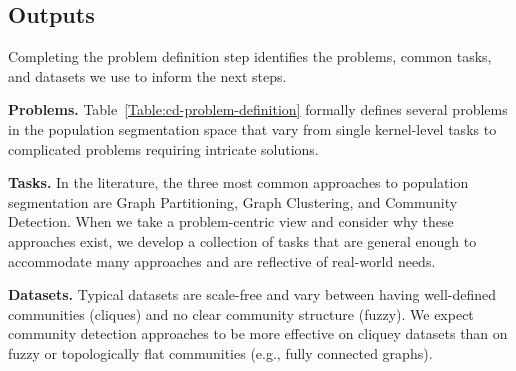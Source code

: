 \subsection{Outputs}
Completing the problem definition step identifies the problems, common tasks, and datasets we use to inform the next steps. 

\textbf{Problems.} Table~\ref{Table:cd-problem-definition} formally defines several problems in the population segmentation space that vary from single kernel-level tasks to complicated problems requiring intricate solutions.

\textbf{Tasks.} 
In the literature, the three most common approaches to population segmentation are Graph Partitioning, Graph Clustering, and Community Detection. 
When we take a problem-centric view and consider why these approaches exist, we develop a collection of tasks that are general enough to accommodate many approaches and are reflective of real-world needs. 

\textbf{Datasets.} Typical datasets are scale-free and vary between having well-defined communities (cliques) and no clear community structure (fuzzy).
We expect community detection approaches to be more effective on cliquey datasets than on fuzzy or topologically flat communities (e.g., fully connected graphs).
